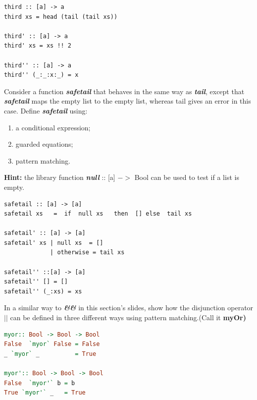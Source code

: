 \documentclass{article}
\begin{document}
\begin{solution}
\begin{lstlisting}
third :: [a] -> a
third xs = head (tail (tail xs)) 

third' :: [a] -> a
third' xs = xs !! 2

third'' :: [a] -> a
third'' (_:_:x:_) = x
\end{lstlisting}
\end{solution}
\begin{exercise} 

Consider a function \textbf{\textit{safetail}} that behaves in the same way as \textbf{\textit{tail}}, except that \textbf{\textit{safetail}} maps the empty list to the empty list, whereas tail gives an error in this case.  Define \textbf{\textit{safetail}} using:
\begin{enumerate}
	\item a conditional expression;
	\item guarded equations;
	\item pattern matching.
\end{enumerate}
\textbf{Hint:}  the library function \textbf{\textit{null}} :: [a] $->$ Bool can be used to test if a list is empty.
\end{exercise}

\begin{solution}
\begin{lstlisting}
safetail :: [a] -> [a]
safetail xs   =  if  null xs   then  [] else  tail xs

safetail' :: [a] -> [a]
safetail' xs | null xs  = []
             | otherwise = tail xs

safetail'' ::[a] -> [a]
safetail'' [] = []
safetail'' (_:xs) = xs
\end{lstlisting}
\end{solution}
\begin{exercise} 
In a similar way to \hspace {.5cm }\textbf{\textit{\&\hspace{-.5cm}\&}} \hspace{.5cm} in this section's slides, 
show how the disjunction operator \textbf{$\vert\vert$ } can be defined in three different ways using pattern matching.(Call it \textbf{myOr)}
\end{exercise}
\begin{solution}
\begin{lstlisting}[language=Haskell]
myor:: Bool -> Bool -> Bool
False  `myor` False = False
_ `myor` _          = True

myor':: Bool -> Bool -> Bool
False  `myor'` b = b
True `myor'` _   = True
\end{lstlisting}
\end{solution}
\end{document}
